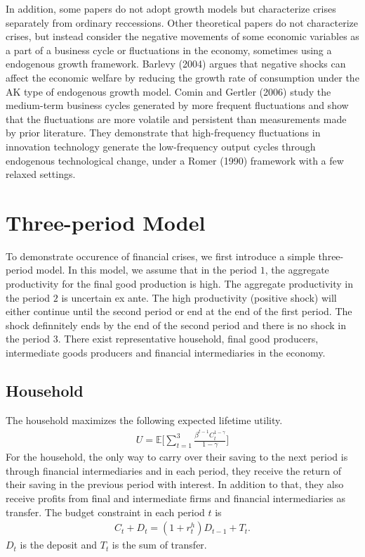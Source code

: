\documentclass[a4paper,12pt]{article}
\begin{document}
In addition, some papers do not adopt growth models but characterize crises separately from ordinary reccessions. Other theoretical papers do not characterize crises, but instead consider the negative movements of some economic variables as a part of a business cycle or fluctuations in the economy, sometimes using a endogenous growth framework. Barlevy (2004) argues that negative shocks can affect the economic welfare by reducing the growth rate of consumption under the AK type of endogenous growth model. Comin and Gertler (2006) study the medium-term business cycles generated by more frequent fluctuations and show that the fluctuations are more volatile and persistent than measurements made by prior literature. They demonstrate that high-frequency fluctuations in innovation technology generate the low-frequency output cycles through endogenous technological change, under a Romer (1990) framework with a few relaxed settings.\par

\section{Three-period Model}
 To demonstrate occurence of financial crises, we first introduce a simple three-period model. In this model, we assume that in the period $1$, the aggregate productivity for the final good production is high. The aggregate productivity in the period $2$ is uncertain ex ante. The high productivity (positive shock) will either continue until the second period or end at the end of the first period. The shock definnitely ends by the end of the second period and there is no shock in the period $3$. There exist representative household, final good producers, intermediate goods producers and financial intermediaries in the economy. 

 \subsection{Household}
The household maximizes the following expected lifetime utility.
\begin{align}
    U = \mathbb{E}\Bigg[\sum_{t=1}^3 \frac{\beta^{t-1} C_t^{1-\gamma}}{1-\gamma}\Bigg]
\end{align}
For the household, the only way to carry over their saving to the next period is through financial intermediaries and in each period, they receive the return of their saving in the previous period with interest. In addition to that, they also receive profits from final and intermediate firms and financial intermediaries as transfer. The budget constraint in each period $t$ is
\begin{align}
    C_t + D_{t} = (1+r^h_t)D_{t-1} + T_t.
\end{align}
$D_t$ is the deposit and $T_t$ is the sum of transfer. 
\end{document}
